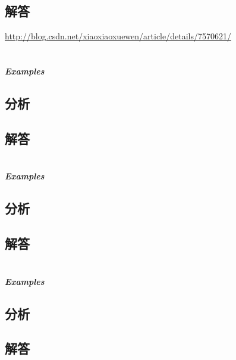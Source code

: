 \documentclass[UTF8,a4paper,12pt]{ctexbook}
\begin{document}
	\subsection{解答}
	
	\url{http://blog.csdn.net/xiaoxiaoxuewen/article/details/7570621/}
	
\section{}
	
	\subparagraph{Examples}
	
	\subsection{分析}
	
	\subsection{解答}
	
\section{}
	
	\subparagraph{Examples}
	
	\subsection{分析}
	
	\subsection{解答}
	
	
\section{}
	
	\subparagraph{Examples}
	
	\subsection{分析}
	
	\subsection{解答}
	
\section{}
	
\end{document}
